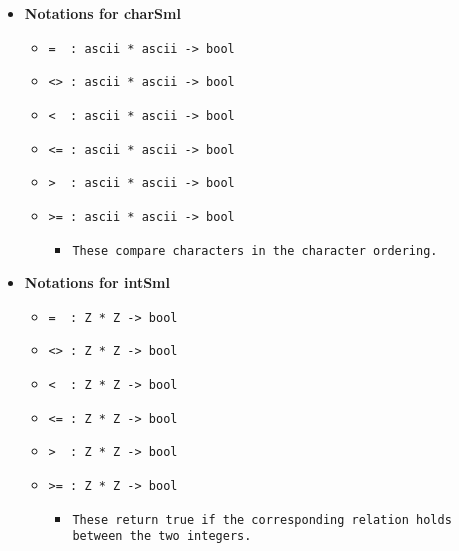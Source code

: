 \documentclass[11pt]{report}
\begin{document}
\begin{itemize}
\begin{itemize}
\end{itemize}


\item  \textbf{Notations for charSml}



\begin{itemize}
\item  \texttt{= \ : ascii * ascii -> bool}

\item  \texttt{<> : ascii * ascii -> bool}

\item  \texttt{< \ : ascii * ascii -> bool}

\item  \texttt{<= : ascii * ascii -> bool}

\item  \texttt{> \ : ascii * ascii -> bool}

\item \begin{flushleft} \texttt{>= : ascii * ascii -> bool} \end{flushleft}

\begin{itemize}
\item  \texttt{These compare characters in the character ordering.}
\end{itemize}

\end{itemize}
\newpage

\item \textbf{Notations for intSml}

\begin{itemize}
\item  \texttt{= \ : Z * Z -> bool}

\item  \texttt{<> : Z * Z -> bool}

\item  \texttt{< \ : Z * Z -> bool}

\item  \texttt{<= : Z * Z -> bool}

\item  \texttt{> \ : Z * Z -> bool}

\item  \texttt{>= : Z * Z -> bool}

\begin{itemize}
\item \begin{flushleft} \texttt{These return true if the corresponding relation holds between the two integers.} \end{flushleft}
\end{itemize}
\coqdocemptyline


\end{itemize}
\end{itemize}
\end{document}
